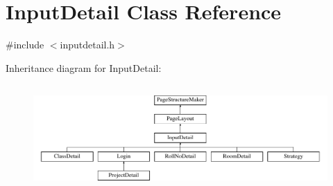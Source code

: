 \hypertarget{classInputDetail}{\section{Input\-Detail Class Reference}
\label{classInputDetail}
}


{\ttfamily \#include $<$inputdetail.\-h$>$}

Inheritance diagram for Input\-Detail\-:\begin{figure}[H]
\begin{center}
\leavevmode
\includegraphics[height=4.087591cm]{classInputDetail}
\end{center}
\end{figure}
